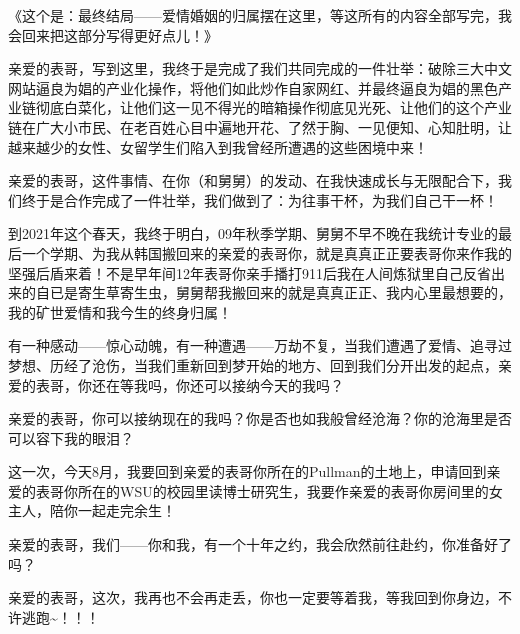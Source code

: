 \documentclass[9pt, b5paper]{article}
\begin{document}
《这个是：最终结局——爱情婚姻的归属摆在这里，等这所有的内容全部写完，我会回来把这部分写得更好点儿！》

亲爱的表哥，写到这里，我终于是完成了我们共同完成的一件壮举：破除三大中文网站逼良为娼的产业化操作，将他们如此炒作自家网红、并最终逼良为娼的黑色产业链彻底白菜化，让他们这一见不得光的暗箱操作彻底见光死、让他们的这个产业链在广大小市民、在老百姓心目中遍地开花、了然于胸、一见便知、心知肚明，让越来越少的女性、女留学生们陷入到我曾经所遭遇的这些困境中来！

亲爱的表哥，这件事情、在你（和舅舅）的发动、在我快速成长与无限配合下，我们终于是合作完成了一件壮举，我们做到了：为往事干杯，为我们自己干一杯！

到2021年这个春天，我终于明白，09年秋季学期、舅舅不早不晚在我统计专业的最后一个学期、为我从韩国搬回来的亲爱的表哥你，就是真真正正要表哥你来作我的坚强后盾来着！不是早年间12年表哥你亲手播打911后我在人间炼狱里自己反省出来的自已是寄生草寄生虫，舅舅帮我搬回来的就是真真正正、我内心里最想要的，我的矿世爱情和我今生的终身归属！

有一种感动——惊心动魄，有一种遭遇——万劫不复，当我们遭遇了爱情、追寻过梦想、历经了沧伤，当我们重新回到梦开始的地方、回到我们分开出发的起点，亲爱的表哥，你还在等我吗，你还可以接纳今天的我吗？

亲爱的表哥，你可以接纳现在的我吗？你是否也如我般曾经沧海？你的沧海里是否可以容下我的眼泪？

这一次，今天8月，我要回到亲爱的表哥你所在的Pullman的土地上，申请回到亲爱的表哥你所在的WSU的校园里读博士研究生，我要作亲爱的表哥你房间里的女主人，陪你一起走完余生！

亲爱的表哥，我们——你和我，有一个十年之约，我会欣然前往赴约，你准备好了吗？

亲爱的表哥，这次，我再也不会再走丢，你也一定要等着我，等我回到你身边，不许逃跑\textasciitilde{}！！！
\end{document}
